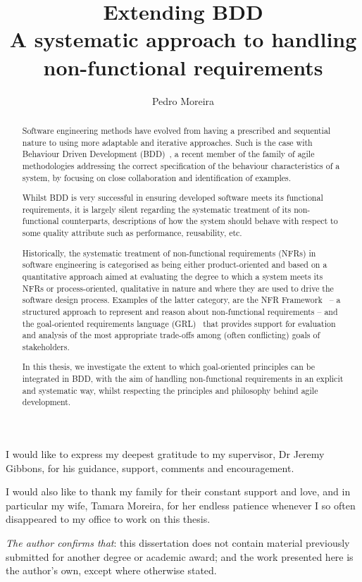 \documentclass[dissertation]{softeng}
\title{Extending BDD\\A systematic approach to handling non-functional requirements}
\author{Pedro Moreira}
\begin{document}
\maketitle


\begin{abstract}
Software engineering methods have evolved from having a prescribed and sequential nature to using more adaptable and iterative approaches. Such is the case with Behaviour Driven Development (BDD)~\citep{North2006}, a recent member of the family of agile methodologies addressing the correct specification of the behaviour characteristics of a system, by focusing on close collaboration and identification of examples.

Whilst BDD is very successful in ensuring developed software meets its functional requirements, it is largely silent regarding the systematic treatment of its non-functional counterparts, descriptions of how the system should behave with respect to some quality attribute such as performance, reusability, etc.

Historically, the systematic treatment of non-functional requirements (NFRs) in software engineering is categorised as being either product-oriented and based on a quantitative approach aimed at evaluating the degree to which a system meets its NFRs or process-oriented, qualitative in nature and where they are used to drive the software design process. Examples of the latter category, are the NFR Framework~\citep{Chung2000} -- a structured approach to represent and reason about non-functional requirements -- and the goal-oriented requirements language (GRL)~\citep{Amyot2010} that provides support for evaluation and analysis of the most appropriate trade-offs among (often conflicting) goals of stakeholders. 

In this thesis, we investigate the extent to which goal-oriented principles can be integrated in BDD, with the aim of handling non-functional requirements in an explicit and systematic way, whilst respecting the principles and philosophy behind agile development.
\end{abstract}

\clearpage

\begin{acknowledgements}
  I would like to express my deepest gratitude to my supervisor, Dr Jeremy Gibbons, for his
  guidance, support, comments and encouragement.
  
  I would also like to thank my family for their constant support and love, and in particular my wife, Tamara Moreira, for her endless patience whenever I so often disappeared to my office to work on this thesis.
  
  \emph{The author confirms that}: this dissertation does not contain material previously submitted for another degree or academic award; and the work presented here is the author's own, except where otherwise stated.
\end{acknowledgements}
\end{document}
